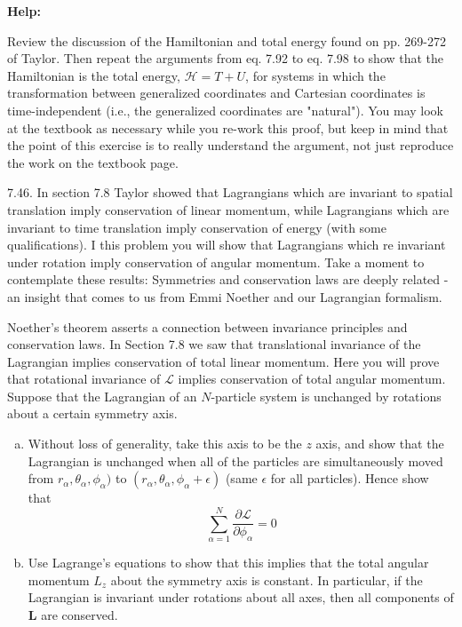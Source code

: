 \documentclass[11pt,letterpaper,boxed]{../hmcpset}
\renewcommand{\vec}[1]{\mathbf{#1}}
\def\Lagr{\mathcal{L}}
\begin{document}
\textbf{Help:} 

\begin{problem}[i]
Review the discussion of the Hamiltonian and total energy found on pp. 269-272 of Taylor. Then repeat the arguments from eq. 7.92 to eq. 7.98 to show that the Hamiltonian is the total energy, $\mathcal{H} = T + U$, for systems in which the transformation between generalized coordinates and Cartesian coordinates is time-independent (i.e., the generalized coordinates are "natural"). You may look at the textbook as necessary while you re-work this proof, but keep in mind that the point of this exercise is to really understand the argument, not just reproduce the work on the textbook page.
\end{problem}

\begin{solution}

\vfill
\end{solution}

\newpage 

\begin{problem}[ii]
7.46. In section 7.8 Taylor showed that Lagrangians which are invariant to spatial translation imply conservation of linear momentum, while Lagrangians which are invariant to time translation imply conservation of energy (with some qualifications). I this problem you will show that Lagrangians which re invariant under rotation imply conservation of angular momentum. Take a moment to contemplate these results: Symmetries and conservation laws are deeply related - an insight that comes to us from Emmi Noether and our Lagrangian formalism.

\begin{problem}[7.46]
Noether's theorem asserts a connection between invariance principles and conservation laws. In Section 7.8 we saw that translational invariance of the Lagrangian implies conservation of total linear momentum. Here you will prove that rotational invariance of $\Lagr$ implies conservation of total angular momentum. Suppose that the Lagrangian of an $N$-particle system is unchanged by rotations about a certain symmetry axis.
\begin{enumerate}[(a)]
\item Without loss of generality, take this axis to be the $z$ axis, and show that the Lagrangian is unchanged when all of the particles are simultaneously moved from $r_\alpha, \theta_\alpha, \phi_\alpha)$ to $(r_\alpha, \theta_\alpha, \phi_\alpha + \epsilon)$ (same $\epsilon$ for all particles). Hence show that 
\[	\sum_{\alpha = 1}^N \frac{\partial \Lagr}{\partial \phi_\alpha} = 0\]
\item Use Lagrange's equations to show that this implies that the total angular momentum $L_z$ about the symmetry axis is constant. In particular, if the Lagrangian is invariant under rotations about all axes, then all components of $\vec L$ are conserved.

\end{enumerate}
\end{problem}
\end{problem}

\begin{solution}

\vfill
\end{solution}
\end{document}
